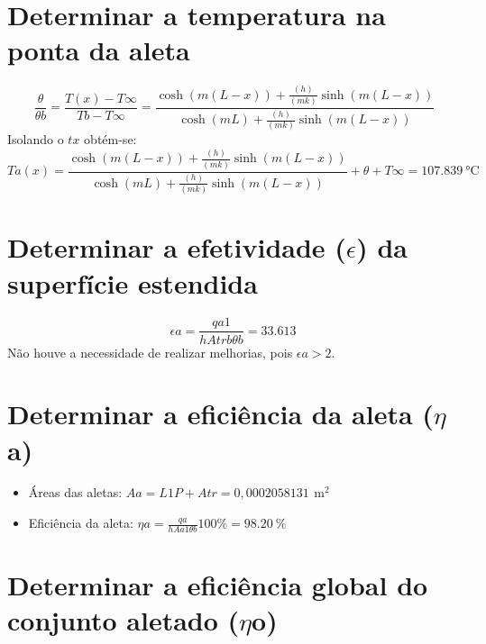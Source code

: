 \section{Determinar a temperatura na
  ponta da aleta}\label{sec:C}
\begin{equation}
    {\frac{\theta}{{\theta}b}}=
    {\frac
    {T(x)-{T\infty}}
    {Tb-{T\infty}}
    }=
    {
    \frac
    {\cosh{(m(L-x))}+{\frac{(h)}{(mk)}}{\sinh{(m(L-x))}}}
    {\cosh{(mL)}+{\frac{(h)}{(mk)}}{\sinh{(m(L-x))}}}
    }
\end{equation}
Isolando o \(tx\) obtém-se:
\begin{equation}
    {Ta(x)}=
    {
    \frac
    {\cosh{(m(L-x))}+{\frac{(h)}{(mk)}}{\sinh{(m(L-x))}}}
    {\cosh{(mL)}+{\frac{(h)}{(mk)}}{\sinh{(m(L-x))}}}
    }+
    {\theta}+
    {T\infty}=
    \SI{107,839}{\degreeCelsius}
\end{equation}

\clearpage

\section{ Determinar a efetividade (\(\epsilon\)) da
  superfície estendida}\label{sec:d}

\begin{equation}
    {{\epsilon}a}=
        {
            \frac
            {{qa1}}
            {{h}{Atrb}{\theta}b}
        }=
        {\SI{33,613}{}}
\end{equation}
Não houve a necessidade de realizar melhorias, pois \({\epsilon}a>{2}\).

\section{
  Determinar a eficiência da aleta (\(\eta\)a)
 }\label{sec:e}

\begin{itemize}[leftmargin=2cm]
    \item Áreas das aletas: \(
          {Aa}={{L1}{P}+{Atr}} = 0,0002058131\,\SI{}{\square\meter}
          \)
    \item Eficiência da aleta: \(
          {\eta}a=
          {\frac{qa}{{h}{Aa1}{\theta}b}}{100\%}=
          {\SI{98,20}{\percent}}
          \)
\end{itemize}

\section{
  Determinar a eficiência global
  do conjunto aletado (\(\eta\)o)
 }\label{sec:f}

